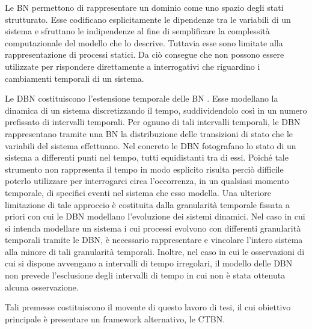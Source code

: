 Le \acf{BN}
\citep{Pearl1988}
permettono di rappresentare un dominio come uno spazio degli stati strutturato.
Esse codificano esplicitamente le dipendenze tra le variabili di un sistema e sfruttano le indipendenze al fine di semplificare la complessità computazionale del modello che lo descrive.
Tuttavia esse sono limitate alla rappresentazione di processi statici.
Da ciò consegue che non possono essere utilizzate per rispondere direttamente a interrogativi che riguardino i cambiamenti temporali di un sistema.

Le \acf{DBN} costituiscono l'estensione temporale delle \acl{BN}
\citep{Dean1989}
. Esse modellano la dinamica di un sistema discretizzando il tempo, suddividendolo così in un numero prefissato di intervalli temporali.
Per ognuno di tali intervalli temporali, le \acl{DBN} rappresentano tramite una \acl{BN} la distribuzione delle transizioni di stato che le variabili del sistema effettuano.
Nel concreto le \acf{DBN} fotografano lo stato di un sistema a differenti punti nel tempo, tutti equidistanti tra di essi.
Poiché tale strumento non rappresenta il tempo in modo esplicito risulta perciò difficile poterlo utilizzare per interrogarci circa l'occorrenza, in un qualsiasi momento temporale, di specifici eventi nel sistema che esso modella.
Una ulteriore limitazione di tale approccio è costituita dalla granularità temporale fissata a priori con cui le \acl{DBN} modellano l'evoluzione dei sistemi dinamici.
Nel caso in cui si intenda modellare un sistema i cui processi evolvono con differenti granularità temporali tramite le \acl{DBN}, è necessario rappresentare e vincolare l'intero sistema alla minore di tali granularità temporali.
Inoltre, nel caso in cui le osservazioni di cui si dispone avvengano a intervalli di tempo irregolari, il modello delle \acl{DBN} non prevede l'esclusione degli intervalli di tempo in cui non è stata ottenuta alcuna osservazione.

Tali premesse costituiscono il movente di questo lavoro di tesi, il cui obiettivo principale è presentare un framework alternativo, le \acf{CTBN}.


